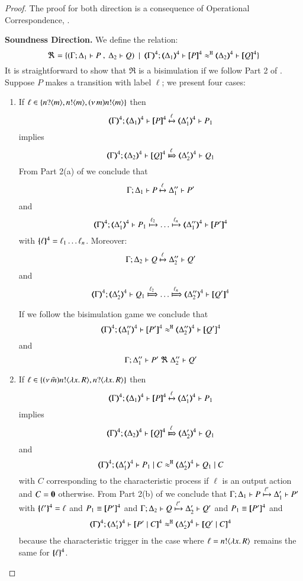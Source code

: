 \begin{proof}
	The proof for both direction is a consequence of Operational Correspondence,
	.

\bigskip

	\noi \textbf{Soundness Direction.} We define the relation: 
%
	\[
		\Re = \set{(\horel{\Gamma}{\Delta_1}{P}{\ ,\ }{\Delta_2}{Q}) \setbar \horel{\tmap{\Gamma}{4}}{\tmap{\Delta_1}{4}}{\pmap{P}{4}}{\hwb}{\tmap{\Delta_2}{4}}{\pmap{Q}{4}}}
	\]
%
	\noi	It is straightforward to show that $\Re$ is a bisimulation if we follow Part 2 of . 
	Suppose $P$ makes a transition with label $\ell$; we
	present four cases:
	\begin{enumerate}
		\item	If $\ell \in \{n ? \langle m \rangle, n ! \langle m \rangle, (\nu\, m) n ! \langle m \rangle\}$ then
		\[
		\horel{\tmap{\Gamma}{4}}{\tmap{\Delta_1}{4}}{\pmap{P}{4}}{\hby{\ell}}{\tmap{\Delta_1'}{4}}{P_1}
		\]
		implies
		\[
		\horel{\tmap{\Gamma}{4}}{\tmap{\Delta_2}{4}}{\pmap{Q}{4}}{\Hby{\ell}}{\tmap{\Delta_2'}{4}}{Q_1}
		\]
		From Part 2(a) of  we conclude that
		\[
		\Gamma; \Delta_1 \vdash P \xmapsto{\ell} \Delta_1'' \vdash P'
		\]
		and
		\[
		\horel{\tmap{\Gamma}{4}}{\tmap{\Delta_1'}{4}}{P_1}{\hby{\ell_2} \dots \hby{\ell_n}}
		{\tmap{\Delta_1''}{4}}{\pmap{P'}{4}}
		\]
		with $\{\!\!\{\ell\}\!\!\}^{4} = \ell_1 \dots \ell_n$.
				Moreover:
		\[
			\Gamma; \Delta_2 \vdash Q \xmapsto{\ell} \Delta_2'' \vdash Q'
		\]
		and
		\[
		\horel{\tmap{\Gamma}{4}}{\tmap{\Delta_2'}{4}}{Q_1}{\Hby{\ell_2} \dots \Hby{\ell_n}}
		{\tmap{\Delta_2''}{4}}{\pmap{Q'}{4}}
		\]
		
		If we follow the bisimulation game we conclude that
		\[
		\horel{\tmap{\Gamma}{4}}{\tmap{\Delta_1''}{4}}{\pmap{P'}{4}}{\hwb}{\tmap{\Delta_2''}{4}}{\pmap{Q'}{4}}
		\]
		and
		\[
		\horel{\Gamma}{\Delta_1''}{P'}{\ \Re\ }{\Delta_2''}{Q'}
		\]
		\item	If $\ell \in \{(\nu\, \tilde{m}) n ! \langle \lambda x.\,R \rangle, n ? \langle \lambda x.\,R \rangle\}$
				then
				\[
				\horel{\tmap{\Gamma}{4}}{\tmap{\Delta_1}{4}}{\pmap{P}{4}}{\hby{\ell}}{\tmap{\Delta_1'}{4}}{P_1}
				\]
				implies
				\[
				\horel{\tmap{\Gamma}{4}}{\tmap{\Delta_2}{4}}{\pmap{Q}{4}}{\Hby{\ell}}{\tmap{\Delta_2'}{4}}{Q_1}
				\]
				and
				\[
				\horel{\tmap{\Gamma}{4}}{\tmap{\Delta_1'}{4}}{P_1 \Par C}{\hwb}{\tmap{\Delta_2'}{4}}{Q_1 \Par C}
				\]
				with $C$ corresponding to the characteristic process if $\ell$ is an output action and $C = \mathbf{0}$ otherwise.
				From Part 2(b) of  we conclude that
				$\Gamma; \Delta_1 \vdash P \xmapsto{\ell'} \Delta_1' \vdash P'$
				with $\{\!\!\{\ell'\}\!\!\}^{4} = \ell$ and $P_1 \equiv [\!\![P']\!\!]^4$
				and
				$\Gamma; \Delta_2 \vdash Q \xmapsto{\ell'} \Delta_2' \vdash Q'$
				and $P_1 \equiv [\!\![P']\!\!]^4$ and
				\begin{eqnarray*}
					\horel{\tmap{\Gamma}{4}}{\tmap{\Delta_1'}{4}}{\pmap{P' \Par C}{4}}{\hwb}{\tmap{\Delta_2'}{4}}{\pmap{Q' \Par C}{4}}
				\end{eqnarray*}
				because the characteristic trigger in the case where $\ell = n ! \langle \lambda x.\,R \rangle$ remains the same
				for $\{\!\!\{\ell\}\!\!\}^{4}$.
				

\end{enumerate}
\end{proof}
